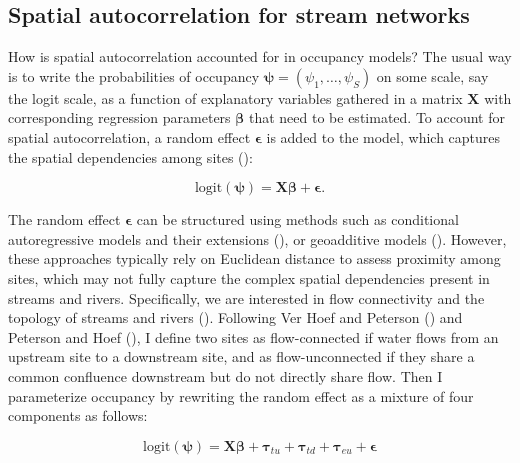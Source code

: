 \documentclass[
  11pt,
  a4paper,
]{article}
\begin{document}
\subsection{Spatial autocorrelation for stream networks}\label{spatial-autocorrelation-for-stream-networks}

How is spatial autocorrelation accounted for in occupancy models? The usual way is to write the probabilities of occupancy \(\boldsymbol{\psi} = (\psi_1, \ldots, \psi_S)\) on some scale, say the logit scale, as a function of explanatory variables gathered in a matrix \(\mathbf{X}\) with corresponding regression parameters \(\boldsymbol{\beta}\) that need to be estimated. To account for spatial autocorrelation, a random effect \(\boldsymbol{\epsilon}\) is added to the model, which captures the spatial dependencies among sites ():

\begin{equation*}
\text{logit}(\boldsymbol{\psi}) = \mathbf{X} \boldsymbol{\beta} + \boldsymbol{\epsilon}.
\end{equation*}

The random effect \(\boldsymbol{\epsilon}\) can be structured using methods such as conditional autoregressive models and their extensions (), or geoadditive models (). However, these approaches typically rely on Euclidean distance to assess proximity among sites, which may not fully capture the complex spatial dependencies present in streams and rivers. Specifically, we are interested in flow connectivity and the topology of streams and rivers (). Following Ver Hoef and Peterson () and Peterson and Hoef (), I define two sites as flow-connected if water flows from an upstream site to a downstream site, and as flow-unconnected if they share a common confluence downstream but do not directly share flow. Then I parameterize occupancy by rewriting the random effect as a mixture of four components as follows:

\begin{equation*}
\text{logit}(\boldsymbol{\psi}) = \mathbf{X} \boldsymbol{\beta} + \boldsymbol{\tau}_{tu} + \boldsymbol{\tau}_{td} + \boldsymbol{\tau}_{eu} + \boldsymbol{\epsilon}
\end{equation*}
\end{document}
